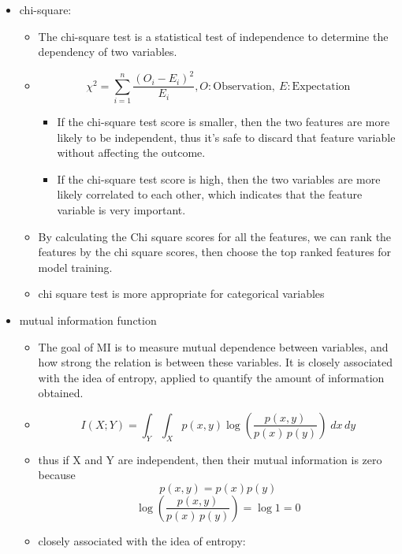 \documentclass[11pt]{article}
\providecommand{\tightlist}{%
      \setlength{\itemsep}{0pt}\setlength{\parskip}{0pt}}
\begin{document}
\begin{itemize}
\tightlist
\item
  chi-square:

  \begin{itemize}
  \tightlist
  \item
    The chi-square test is a statistical test of independence to
    determine the dependency of two variables.
  \item
    \[\chi^2=\sum_{i=1}^{n} \frac{(O_i - E_i)^2}{E_i},
    O: \text{Observation}, \:
    E: \text{Expectation}\]

    \begin{itemize}
    \tightlist
    \item
      If the chi-square test score is smaller, then the two features are
      more likely to be independent, thus it's safe to discard that
      feature variable without affecting the outcome.
    \item
      If the chi-square test score is high, then the two variables are
      more likely correlated to each other, which indicates that the
      feature variable is very important.
    \end{itemize}
  \item
    By calculating the Chi square scores for all the features, we can
    rank the features by the chi square scores, then choose the top
    ranked features for model training.
  \item
    chi square test is more appropriate for categorical variables
  \end{itemize}
\item
  mutual information function

  \begin{itemize}
  \tightlist
  \item
    The goal of MI is to measure mutual dependence between variables,
    and how strong the relation is between these variables. It is
    closely associated with the idea of entropy, applied to quantify the
    amount of information obtained.
  \item
    \[{\displaystyle I(X;Y)=\int _{Y}\int _{X}p(x,y)\log {\left({\frac {p(x,y)}{p(x)\,p(y)}}\right)}\;dx\,dy}\]
  \item
    thus if X and Y are independent, then their mutual information is
    zero because \[p(x,y) = p(x)p(y)\]
    \[\log {\left({\frac {p(x,y)}{p(x)\,p(y)}}\right)} = \log 1 = 0\]
  \item
    closely associated with the idea of entropy:
  \end{itemize}
\end{itemize}
\end{document}
